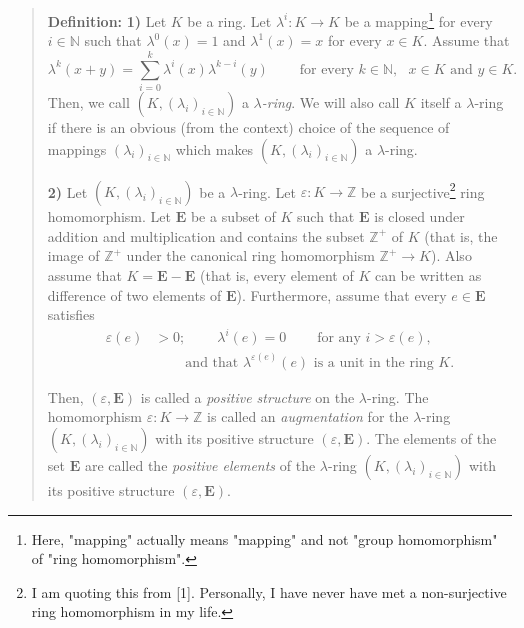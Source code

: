 \documentclass[12pt,final,notitlepage,onecolumn,german]{article}%
\begin{document}
\begin{quote}
\textbf{Definition:} \textbf{1)} Let $K$ be a ring. Let $\lambda
^{i}:K\rightarrow K$ be a mapping\footnote{Here, "mapping" actually means
"mapping" and not "group homomorphism" of "ring homomorphism".} for every
$i\in\mathbb{N}$ such that $\lambda^{0}\left(  x\right)  =1$ and $\lambda
^{1}\left(  x\right)  =x$ for every $x\in K$. Assume that%
\begin{equation}
\lambda^{k}\left(  x+y\right)  =\sum_{i=0}^{k}\lambda^{i}\left(  x\right)
\lambda^{k-i}\left(  y\right)  \ \ \ \ \ \ \ \ \ \ \text{for every }%
k\in\mathbb{N},\text{ }x\in K\text{ and }y\in K. \label{lambda1}%
\end{equation}
Then, we call $\left(  K,\left(  \lambda_{i}\right)  _{i\in\mathbb{N}}\right)
$ a $\lambda$\textit{-ring}. We will also call $K$ itself a $\lambda$-ring if
there is an obvious (from the context) choice of the sequence of mappings
$\left(  \lambda_{i}\right)  _{i\in\mathbb{N}}$ which makes $\left(  K,\left(
\lambda_{i}\right)  _{i\in\mathbb{N}}\right)  $ a $\lambda$-ring.

\textbf{2)} Let $\left(  K,\left(  \lambda_{i}\right)  _{i\in\mathbb{N}%
}\right)  $ be a $\lambda$-ring. Let $\varepsilon:K\rightarrow\mathbb{Z}$ be a
surjective\footnote{I am quoting this from [1]. Personally, I have never have
met a non-surjective ring homomorphism in my life.} ring homomorphism. Let
$\mathbf{E}$ be a subset of $K$ such that $\mathbf{E}$ is closed under
addition and multiplication and contains the subset $\mathbb{Z}^{+}$ of $K$
(that is, the image of $\mathbb{Z}^{+}$ under the canonical ring homomorphism
$\mathbb{Z}^{+}\rightarrow K$). Also assume that $K=\mathbf{E}-\mathbf{E}$
(that is, every element of $K$ can be written as difference of two elements of
$\mathbf{E}$). Furthermore, assume that every $e\in\mathbf{E}$ satisfies%
\begin{align*}
\varepsilon\left(  e\right)   &  >0;\ \ \ \ \ \ \ \ \ \ \lambda^{i}\left(
e\right)  =0\ \ \ \ \ \ \ \ \ \ \text{for any }i>\varepsilon\left(  e\right)
,\\
&  \ \ \ \ \ \ \ \ \ \ \text{and that }\lambda^{\varepsilon\left(  e\right)
}\left(  e\right)  \text{ is a unit in the ring }K.
\end{align*}


Then, $\left(  \varepsilon,\mathbf{E}\right)  $ is called a \textit{positive
structure} on the $\lambda$-ring. The homomorphism $\varepsilon:K\rightarrow
\mathbb{Z}$ is called an \textit{augmentation} for the $\lambda$-ring $\left(
K,\left(  \lambda_{i}\right)  _{i\in\mathbb{N}}\right)  $ with its positive
structure $\left(  \varepsilon,\mathbf{E}\right)  $. The elements of the set
$\mathbf{E}$ are called the \textit{positive elements} of the $\lambda$-ring
$\left(  K,\left(  \lambda_{i}\right)  _{i\in\mathbb{N}}\right)  $ with its
positive structure $\left(  \varepsilon,\mathbf{E}\right)  $.


\end{quote}
\end{document}
